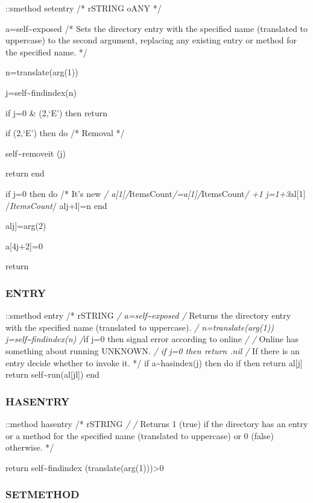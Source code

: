 ::smethod setentry /* rSTRING oANY */

a=self\textasciitilde exposed /* Sets the directory entry with the
specified name (translated to uppercase) to the second argument,
replacing any existing entry or method for the specified name. */

n=translate(arg(1))

j=self\textasciitilde findindex(n)

if j=0 \& \arg(2,`E') then return

if \arg(2,`E') then do /* Removal */

self\textasciitilde removeit (j)

return end

if j=0 then do /* It's new \emph{/
a{[}1{]}/}ItemsCount\emph{/=a{[}1{]}/}ItemsCount\emph{/ +1
j=1+3}al{[}1{]} /\emph{ItemsCount}/ alj+l{]}=n end

alj{]}=arg(2)

a{[}4j+2{]}=0

return

\hypertarget{entry}{%
\subsubsection{ENTRY}\label{entry}}

::smethod entry /* rSTRING \emph{/ a=self\textasciitilde exposed /}
Returns the directory entry with the specified name (translated to
uppercase). \emph{/ n=translate(arg(1))
j=self\textasciitilde findindex(n) /}if j=0 then signal error according
to online \emph{/ /} Online has something about running UNKNOWN. \emph{/
if j=0 then return .nil /} If there is an entry decide whether to invoke
it. */ if a\textasciitilde hasindex(j) then do if \al[j+2] then return
al{[}j{]} return self\textasciitilde run(al{[}jl{]}) end

\hypertarget{hasentry}{%
\subsubsection{HASENTRY}\label{hasentry}}

::method hasentry /* rSTRING \emph{/ /} Returns 1 (true) if the
directory has an entry or a method for the specified name (translated to
uppercase) or 0 (false) otherwise. */

return self\textasciitilde findindex (translate(arg(1)))\textgreater0

\hypertarget{setmethod}{%
\subsubsection{SETMETHOD}\label{setmethod}}

